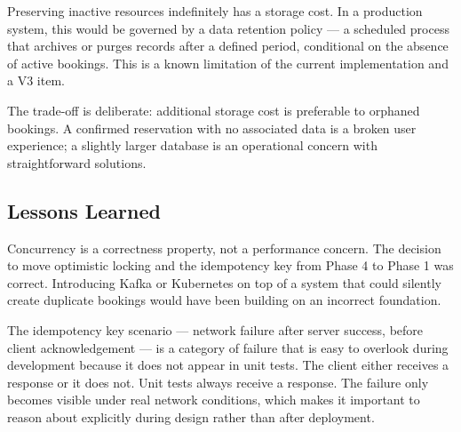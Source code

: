 Preserving inactive resources indefinitely has a storage cost. In a production system, this would be governed by a data retention policy --- a scheduled process that archives or purges records after a defined period, conditional on the absence of active bookings. This is a known limitation of the current implementation and a V3 item.

The trade-off is deliberate: additional storage cost is preferable to orphaned bookings. A confirmed reservation with no associated data is a broken user experience; a slightly larger database is an operational concern with straightforward solutions.

\subsection{Lessons Learned}

Concurrency is a correctness property, not a performance concern. The decision to move optimistic locking and the idempotency key from Phase 4 to Phase 1 was correct. Introducing Kafka or Kubernetes on top of a system that could silently create duplicate bookings would have been building on an incorrect foundation.

The idempotency key scenario --- network failure after server success, before client acknowledgement --- is a category of failure that is easy to overlook during development because it does not appear in unit tests. The client either receives a response or it does not. Unit tests always receive a response. The failure only becomes visible under real network conditions, which makes it important to reason about explicitly during design rather than after deployment.